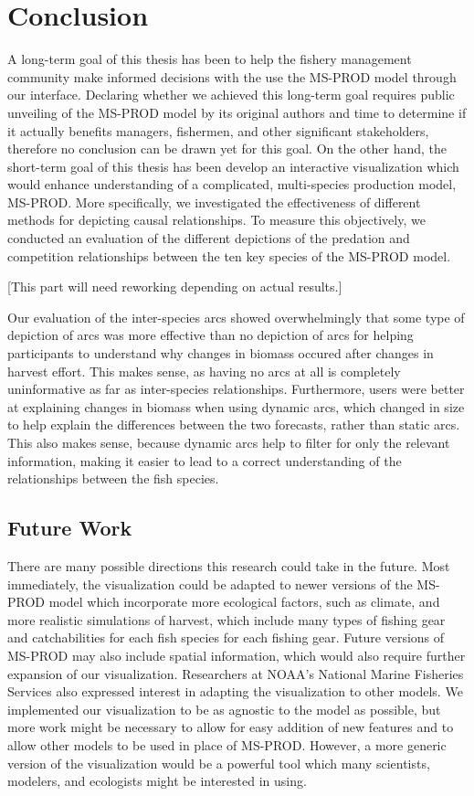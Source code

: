 \chapter{Conclusion}

A long-term goal of this thesis has been to help the fishery management community make informed decisions with the use the MS-PROD model through our interface.  Declaring whether we achieved this long-term goal requires public unveiling of the MS-PROD model by its original authors and time to determine if it actually benefits managers, fishermen, and other significant stakeholders, therefore no conclusion can be drawn yet for this goal.  On the other hand, the short-term goal of this thesis has been develop an interactive visualization which would enhance understanding of a complicated, multi-species production model, MS-PROD.  More specifically, we investigated the effectiveness of different methods for depicting causal relationships.  To measure this objectively, we conducted an evaluation of the different depictions of the predation and competition relationships between the ten key species of the MS-PROD model.

[This part will need reworking depending on actual results.]

Our evaluation of the inter-species arcs showed overwhelmingly that some type of depiction of arcs was more effective than no depiction of arcs for helping participants to understand why changes in biomass occured after changes in harvest effort.  This makes sense, as having no arcs at all is completely uninformative as far as inter-species relationships.  Furthermore, users were better at explaining changes in biomass when using dynamic arcs, which changed in size to help explain the differences between the two forecasts, rather than static arcs.  This also makes sense, because dynamic arcs help to filter for only the relevant information, making it easier to lead to a correct understanding of the relationships between the fish species.  

\section{Future Work}

There are many possible directions this research could take in the future.  Most immediately, the visualization could be adapted to newer versions of the MS-PROD model which incorporate more ecological factors, such as climate, and more realistic simulations of harvest, which include many types of fishing gear and catchabilities for each fish species for each fishing gear.  Future versions of MS-PROD may also include spatial information, which would also require further expansion of our visualization.  Researchers at NOAA's National Marine Fisheries Services also expressed interest in adapting the visualization to other models.  We implemented our visualization to be as agnostic to the model as possible, but more work might be necessary to allow for easy addition of new features and to allow other models to be used in place of MS-PROD.  However, a more generic version of the visualization would be a powerful tool which many scientists, modelers, and ecologists might be interested in using.

